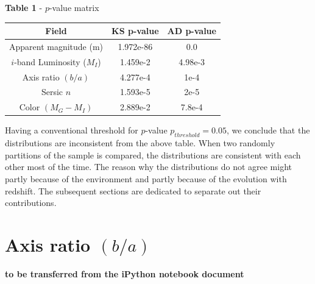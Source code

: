 \documentclass[twocolumn,useAMS,usenatbib]{mn2e}
\newcommand{\mi}{\ensuremath{M_I}}
\newcommand{\sersicn}{Sersic $n$}
\begin{document}
{\bf Table 1 } - $p$-value matrix 
\begin{tabular}{||c|c|c||}
 \hline
  Field & KS p-value & AD p-value \\
 \hline 
  Apparent magnitude (m) & 1.972e-86 & 0.0 \\
  $i$-band Luminosity (\mi) & 1.459e-2 & 4.98e-3 \\
  Axis ratio $(b/a)$ & 4.277e-4 & 1e-4\\
  \sersicn & 1.593e-5 & 2e-5\\
  Color $(M_G-M_I)$ & 2.889e-2 & 7.8e-4\\
  
\end{tabular}

Having a conventional threshold for $p$-value $p_{threshold} = 0.05$, we conclude that the distributions are inconsistent from the above table.
When two randomly partitions of the sample is compared, the distributions are consistent with each other most of the time. The reason why the distributions
do not agree might partly because of the environment and partly because of the evolution with redshift. The subsequent sections are dedicated to separate out
their contributions.



% 

\section{Axis ratio $(b/a)$}

{\bf to be transferred from the iPython notebook document}
\end{document}
